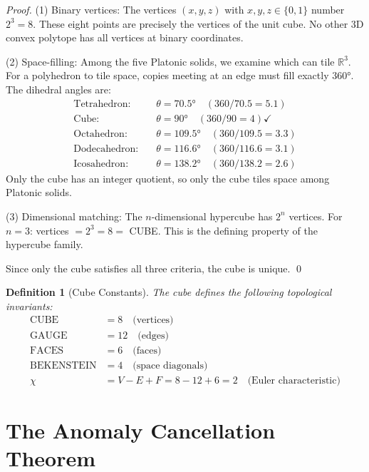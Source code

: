 \documentclass[twocolumn,showpacs,preprintnumbers,amsmath,amssymb,prd]{revtex4-2}
\newtheorem{definition}[theorem]{Definition}
\begin{document}
\begin{proof}
(1) Binary vertices: The vertices $(x,y,z)$ with $x,y,z \in \{0,1\}$ number $2^3 = 8$. These eight points are precisely the vertices of the unit cube. No other 3D convex polytope has all vertices at binary coordinates.

(2) Space-filling: Among the five Platonic solids, we examine which can tile $\mathbb{R}^3$. For a polyhedron to tile space, copies meeting at an edge must fill exactly $360°$. The dihedral angles are:
\begin{align}
\text{Tetrahedron:} & \quad \theta = 70.5° \quad (360/70.5 = 5.1) \nonumber\\
\text{Cube:} & \quad \theta = 90° \quad (360/90 = 4) \checkmark \nonumber\\
\text{Octahedron:} & \quad \theta = 109.5° \quad (360/109.5 = 3.3) \nonumber\\
\text{Dodecahedron:} & \quad \theta = 116.6° \quad (360/116.6 = 3.1) \nonumber\\
\text{Icosahedron:} & \quad \theta = 138.2° \quad (360/138.2 = 2.6) \nonumber
\end{align}
Only the cube has an integer quotient, so only the cube tiles space among Platonic solids.

(3) Dimensional matching: The $n$-dimensional hypercube has $2^n$ vertices. For $n=3$: vertices $= 2^3 = 8 = $ CUBE. This is the defining property of the hypercube family.

Since only the cube satisfies all three criteria, the cube is unique. \qed
\end{proof}

\begin{definition}[Cube Constants]
The cube defines the following topological invariants:
\begin{align}
\text{CUBE} &= 8 \quad \text{(vertices)} \\
\text{GAUGE} &= 12 \quad \text{(edges)} \\
\text{FACES} &= 6 \quad \text{(faces)} \\
\text{BEKENSTEIN} &= 4 \quad \text{(space diagonals)} \\
\chi &= V - E + F = 8 - 12 + 6 = 2 \quad \text{(Euler characteristic)}
\end{align}
\end{definition}

\section{The Anomaly Cancellation Theorem}
\end{document}
